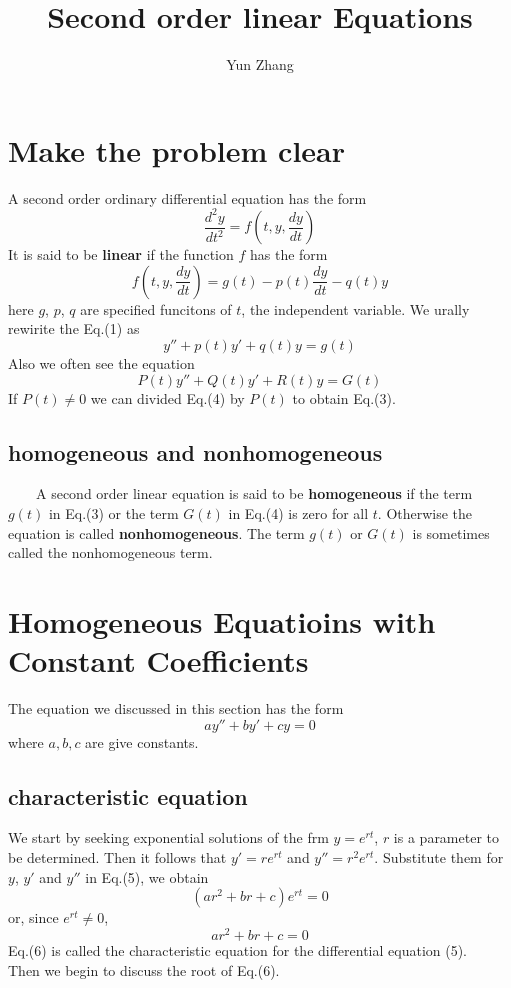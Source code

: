 \documentclass{article}
\title{Second order linear Equations}
\author{Yun Zhang}
\date{}
\begin{document}
\maketitle

\section{Make the problem clear}
A second order ordinary differential equation has the form
\begin{equation}
	\frac{d^2y}{dt^2} = f\left(t, y, \frac{dy}{dt}\right)
\end{equation}
It is said to be \textbf{linear} if the function $f$ has the form
\begin{equation}
	f\left(t,y,\frac{dy}{dt}\right) = g(t) - p(t)\frac{dy}{dt} - q(t)y 
\end{equation}
here $g$, $p$, $q$ are specified funcitons of $t$, the independent variable. We urally rewirite the Eq.(1) as 
\begin{equation}
	y'' + p(t)y' + q(t) y = g(t)
\end{equation}
Also we often see the equation
\begin{equation}
	P(t)y'' + Q(t)y' +R(t)y = G(t)
\end{equation}
If $P(t) \neq 0$ we can divided Eq.(4) by $P(t)$ to obtain Eq.(3).

\subsection*{homogeneous and nonhomogeneous}

$\qquad$A second order linear equation is said to be \textbf{homogeneous} if the term $g(t)$ in Eq.(3) or the term $G(t)$ in Eq.(4) is zero for all $t$. Otherwise the equation is called \textbf{nonhomogeneous}. The term $g(t)$ or $G(t)$ is sometimes called the nonhomogeneous term.


\section{Homogeneous Equatioins with Constant Coefficients}
The equation we discussed in this section has the form
\begin{equation}
	ay''+by'+cy = 0
\end{equation}
where $a,b,c$ are give constants.
\subsection{characteristic equation}
We start by seeking exponential solutions of the frm $y = e^{rt}$, $r$ is a parameter to be determined. Then it follows that $y' = re^{rt}$ and $y'' = r^2e^{rt}$. Substitute them for $y$, $y'$ and $y''$ in Eq.(5), we obtain
\[(ar^2+br+c)e^{rt} = 0\]
or, since $e^{rt}\neq 0$,
\begin{equation}
	ar^2+br+c = 0
\end{equation}
Eq.(6) is called the characteristic equation for the differential equation (5).\\
Then we begin to discuss the root of Eq.(6).
\end{document}
